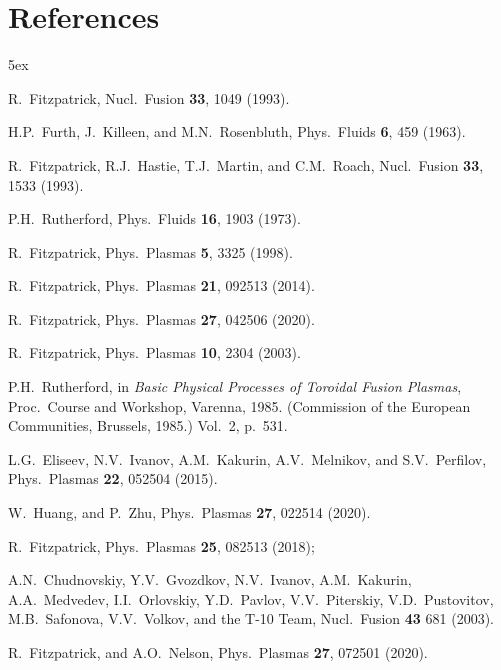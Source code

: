 \documentclass[12pt,prb,aps]{revtex4-1}
\begin{document}
\section*{References}
\begin{thebibliography}{99}\baselineskip 5ex

 R.~Fitzpatrick, Nucl.\ Fusion {\bf 33}, 1049 (1993).

 H.P.~Furth,  J.~Killeen, and M.N.~Rosenbluth,  Phys.\ Fluids {\bf 6}, 459 (1963).

 R.~Fitzpatrick, R.J.~Hastie, T.J.~Martin, and C.M.~Roach, Nucl.\ Fusion {\bf 33}, 1533 (1993).

 P.H.~Rutherford,  Phys.\ Fluids  {\bf 16}, 1903 (1973).

 R.~Fitzpatrick, Phys.\ Plasmas {\bf 5}, 3325 (1998).

 R.~Fitzpatrick, Phys.\ Plasmas {\bf 21}, 092513 (2014).

 R.~Fitzpatrick, Phys.\ Plasmas {\bf 27}, 042506 (2020).

 R.~Fitzpatrick, Phys.\ Plasmas {\bf 10}, 2304 (2003).

 P.H.~Rutherford, in  {\it Basic Physical Processes of
Toroidal Fusion Plasmas}, Proc.\ Course and Workshop, Varenna, 1985. (Commission of the European Communities, Brussels, 1985.) Vol.~2, p.~531.

 L.G.~Eliseev, N.V.~Ivanov, A.M.~Kakurin, A.V.~Melnikov, and S.V.~Perfilov, Phys.\ Plasmas {\bf 22}, 052504 (2015). 

 W.~Huang, and P.~Zhu, Phys.\ Plasmas {\bf 27}, 022514 (2020).

 R.~Fitzpatrick, Phys.\ Plasmas {\bf 25}, 082513 (2018);

 A.N.~Chudnovskiy, Y.V.~Gvozdkov, N.V.~Ivanov, A.M.~Kakurin,
A.A.~Medvedev, I.I.~Orlovskiy, Y.D.~Pavlov, V.V.~Piterskiy, V.D.~Pustovitov,
M.B.~Safonova, V.V.~Volkov, and the T-10 Team, Nucl.\ Fusion {\bf 43} 681 (2003).

 R.~Fitzpatrick, and A.O.~Nelson, Phys.\ Plasmas {\bf 27}, 072501 (2020).

\end{thebibliography}

\end{document}
